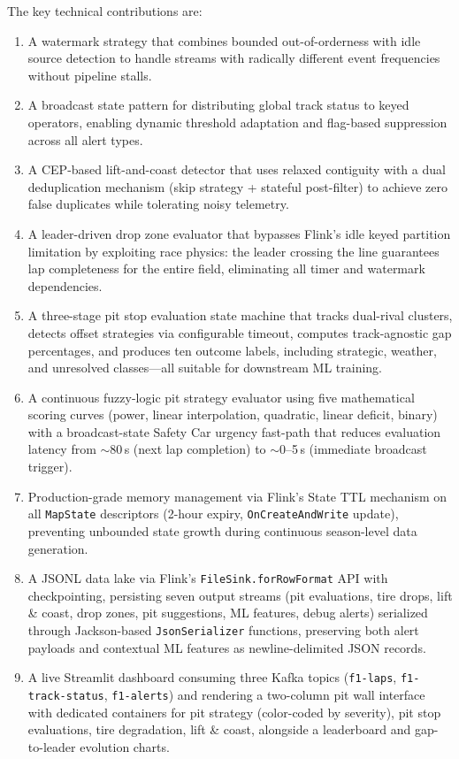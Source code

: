 \documentclass[a4paper,twocolumn]{article}
\begin{document}
The key technical contributions are:
\begin{enumerate}
  \item A watermark strategy that combines bounded out-of-orderness with
    idle source detection to handle streams with radically different event
    frequencies without pipeline stalls.
  \item A broadcast state pattern for distributing global track status to
    keyed operators, enabling dynamic threshold adaptation and flag-based
    suppression across all alert types.
  \item A CEP-based lift-and-coast detector that uses relaxed contiguity
    with a dual deduplication mechanism (skip strategy + stateful post-filter)
    to achieve zero false duplicates while tolerating noisy telemetry.
  \item A leader-driven drop zone evaluator that bypasses Flink's idle
    keyed partition limitation by exploiting race physics: the leader
    crossing the line guarantees lap completeness for the entire field,
    eliminating all timer and watermark dependencies.
  \item A three-stage pit stop evaluation state machine that tracks
    dual-rival clusters, detects offset strategies via configurable
    timeout, computes track-agnostic gap percentages, and produces
    ten outcome labels, including strategic, weather, and unresolved
    classes---all suitable for downstream ML training.
  \item A continuous fuzzy-logic pit strategy evaluator using five
    mathematical scoring curves (power, linear interpolation, quadratic,
    linear deficit, binary) with a broadcast-state Safety Car urgency
    fast-path that reduces evaluation latency from $\sim$80\,s (next
    lap completion) to $\sim$0--5\,s (immediate broadcast trigger).
  \item Production-grade memory management via Flink's State TTL
    mechanism on all \texttt{MapState} descriptors (2-hour expiry,
    \texttt{OnCreateAndWrite} update), preventing unbounded state
    growth during continuous season-level data generation.
  \item A JSONL data lake via Flink's \texttt{FileSink.forRowFormat} API
    with checkpointing, persisting seven output streams (pit evaluations,
    tire drops, lift \& coast, drop zones, pit suggestions, ML features,
    debug alerts)
    serialized through Jackson-based \texttt{JsonSerializer} functions,
    preserving both alert payloads and contextual ML features as
    newline-delimited JSON records.
  \item A live Streamlit dashboard consuming three Kafka topics
    (\texttt{f1-laps}, \texttt{f1-track-status}, \texttt{f1-alerts})
    and rendering a two-column pit wall interface with dedicated
    containers for pit strategy (color-coded by severity), pit stop
    evaluations, tire degradation, lift \& coast, alongside a
    leaderboard and gap-to-leader evolution charts.
\end{enumerate}
\end{document}
